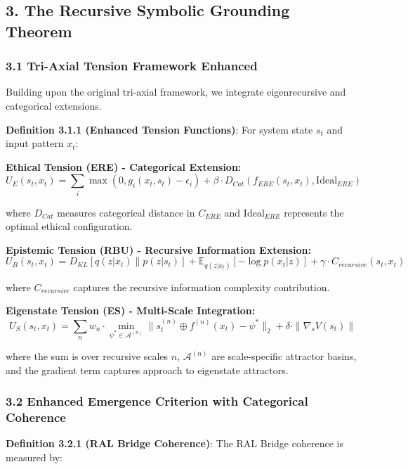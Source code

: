\documentclass[
]{article}
\begin{document}
\subsection{3. The Recursive Symbolic Grounding
Theorem}\label{the-recursive-symbolic-grounding-theorem}

\subsubsection{3.1 Tri-Axial Tension Framework
Enhanced}\label{tri-axial-tension-framework-enhanced}

Building upon the original tri-axial framework, we integrate
eigenrecursive and categorical extensions.

\textbf{Definition 3.1.1 (Enhanced Tension Functions)}: For system state
\(s_t\) and input pattern \(x_t\):

\textbf{Ethical Tension (ERE) - Categorical Extension:}
\[U_E(s_t, x_t) = \sum_{i} \max(0, g_i(x_t, s_t) - \epsilon_i) + \beta \cdot D_{Cat}(f_{ERE}(s_t, x_t), \text{Ideal}_{ERE})\]

where \(D_{Cat}\) measures categorical distance in \(C_{ERE}\) and
\(\text{Ideal}_{ERE}\) represents the optimal ethical configuration.

\textbf{Epistemic Tension (RBU) - Recursive Information Extension:}
\[U_B(s_t, x_t) = D_{KL}[q(z|x_t) \| p(z|s_t)] + \mathbb{E}_{q(z|x_t)}[-\log p(x_t|z)] + \gamma \cdot C_{recursive}(s_t, x_t)\]

where \(C_{recursive}\) captures the recursive information complexity
contribution.

\textbf{Eigenstate Tension (ES) - Multi-Scale Integration:}
\[U_S(s_t, x_t) = \sum_{n} w_n \cdot \min_{\psi^* \in \mathcal{A}^{(n)}} \|s_t^{(n)} \oplus f^{(n)}(x_t) - \psi^*\|_2 + \delta \cdot \|\nabla_s V(s_t)\|\]

where the sum is over recursive scales \(n\), \(\mathcal{A}^{(n)}\) are
scale-specific attractor basins, and the gradient term captures approach
to eigenstate attractors.

\subsubsection{3.2 Enhanced Emergence Criterion with Categorical
Coherence}\label{enhanced-emergence-criterion-with-categorical-coherence}

\textbf{Definition 3.2.1 (RAL Bridge Coherence)}: The RAL Bridge
coherence is measured by:
\end{document}
